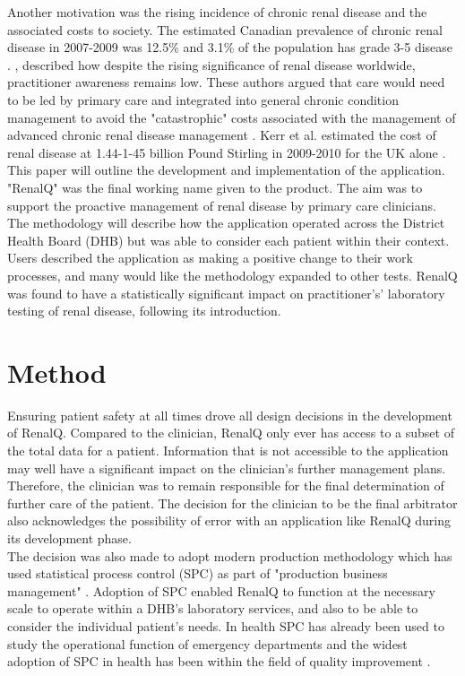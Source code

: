 ﻿\documentclass[11pt]{article}
\begin{document}
Another motivation was the rising incidence of chronic renal disease and the associated costs to society. The estimated Canadian prevalence of chronic renal disease in 2007-2009 was 12.5\% and 3.1\% of the population has grade 3-5 disease \citep{arora2013prevalence}. \citep{anachronistic}, described how despite the rising significance of renal disease worldwide, practitioner awareness remains low. These authors argued that care would need to be led by primary care and integrated into general chronic condition management to avoid the "catastrophic" costs associated with the management of advanced chronic renal disease management \citep{jha2013chronic}. Kerr et al. estimated the cost of renal disease at 1.44-1-45 billion Pound Stirling in 2009-2010 for the UK alone \citep{underestimating}.\\

This paper will outline the development and implementation of the application. "RenalQ" was the final working name given to the product. The aim was to support the proactive management of renal disease by primary care clinicians. The methodology will describe how the application operated across the District Health Board (DHB) but was able to consider each patient within their context.  Users described the application as making a positive change to their work processes, and many would like the methodology expanded to other tests. RenalQ was found to have a statistically significant impact on practitioner's' laboratory testing of renal disease, following its introduction.\\

\section{Method}
Ensuring patient safety at all times drove all design decisions in the development of RenalQ. Compared to the clinician, RenalQ only ever has access to a subset of the total data for  a patient. Information that is not accessible to the application may well have a significant impact on the clinician's further management plans. Therefore, the clinician was to remain responsible for the final determination of further care of the patient.   The decision for the clinician to be the final arbitrator also acknowledges the possibility of error with an application like RenalQ during its development phase. \\

The decision was also made to adopt modern production methodology which has used statistical process control (SPC) as part of "production business management" \citep{rosemann2015six, cheng2015run, epprecht2015statistical}. Adoption of SPC enabled RenalQ to function at the necessary scale to operate within a DHB's laboratory services, and also to  be able to consider the individual patient's needs. In health SPC has already been used to study the operational function of emergency departments \citep{pimentel2015statistical} and the widest adoption of SPC in health has been within the field of quality improvement \citep{provost2011health}.\\
\end{document}
